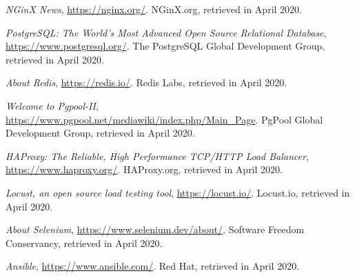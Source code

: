 \documentclass[12pt]{article}
\begin{document}
\begin{thebibliography}{9}
  \textit{NGinX News},
  \url{https://nginx.org/}.
  NGinX.org,
  retrieved in April 2020.
  \vspace{-10pt}

  \textit{PostgreSQL: The World's Most Advanced Open Source Relational Database},
  \url{https://www.postgresql.org/}.
  The PostgreSQL Global Development Group,
  retrieved in April 2020.
  \vspace{-10pt}

  \textit{About Redis},
  \url{https://redis.io/}.
  Redis Labs,
  retrieved in April 2020.
  \vspace{-10pt}

  \textit{Welcome to Pgpool-II},
  \url{https://www.pgpool.net/mediawiki/index.php/Main_Page}.
  PgPool Global Development Group,
  retrieved in April 2020.
  \vspace{-10pt}

  \textit{HAProxy: The Reliable, High Performance TCP/HTTP Load Balancer},
  \url{https://www.haproxy.org/}.
  HAProxy.org,
  retrieved in April 2020.
  \vspace{-10pt}

  \textit{Locust, an open source load testing tool},
  \url{https://locust.io/}.
  Locust.io,
  retrieved in April 2020.
  \vspace{-10pt}

  \textit{About Selenium},
  \url{https://www.selenium.dev/about/}.
  Software Freedom Conservancy,
  retrieved in April 2020.
  \vspace{-10pt}

  \textit{Ansible},
  \url{https://www.ansible.com/}.
  Red Hat,
  retrieved in April 2020.

\end{thebibliography}

\clearpage
\end{document}
